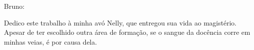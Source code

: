 Bruno:

Dedico este trabalho à minha avó Nelly, que entregou sua vida ao magistério. Apesar de ter escolhido outra área de formação, se o sangue da docência corre em minhas veias, é por causa dela.



